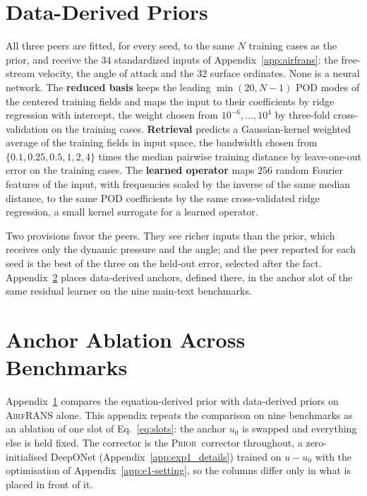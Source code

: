 \documentclass{article}
\newcommand{\armprior}{\textsc{Prior}}
\begin{document}
\section{Data-Derived Priors}
\label{app:peers}

All three peers are fitted, for every seed, to the same $N$ training cases as the
prior, and receive the $34$ standardized inputs of Appendix~\ref{app:airfrans}: the
free-stream velocity, the angle of attack and the $32$ surface ordinates. None is a
neural network. The \textbf{reduced basis} \citep{sirovich1987turbulence} keeps the
leading $\min(20,N-1)$ POD modes of the centered training fields and maps the input to
their coefficients by ridge regression with intercept, the weight chosen from
$10^{-6},\dots,10^{4}$ by three-fold cross-validation on the training cases.
\textbf{Retrieval} \citep{yue2025deltaphi} predicts a Gaussian-kernel weighted average
of the training fields in input space, the bandwidth chosen from
$\{0.1,0.25,0.5,1,2,4\}$ times the median pairwise training distance by leave-one-out
error on the training cases. The \textbf{learned operator} maps $256$ random Fourier
features of the input, with frequencies scaled by the inverse of the same median
distance, to the same POD coefficients by the same cross-validated ridge regression, a
small kernel surrogate for a learned operator.

Two provisions favor the peers. They see richer inputs than the prior, which receives
only the dynamic pressure and the angle; and the peer reported for each seed is the
best of the three on the held-out error, selected after the fact.
Appendix~\ref{app:anchor} places data-derived anchors, defined there, in the anchor
slot of the same residual learner on the nine main-text benchmarks.








\section{Anchor Ablation Across Benchmarks}
\label{app:anchor}

Appendix~\ref{app:peers} compares the equation-derived prior with data-derived
priors on \textsc{AirfRANS} alone. This appendix repeats the comparison on nine
benchmarks as an ablation of one slot of Eq.~\ref{eq:slots}: the anchor
$u_0$ is swapped and everything else is held fixed. The corrector is the \armprior\
corrector throughout, a zero-initialised DeepONet (Appendix~\ref{app:exp1_details})
trained on $u-u_0$ with the optimisation of Appendix~\ref{app:e1-setting}, so the
columns differ only in what is placed in front of it.
\end{document}
